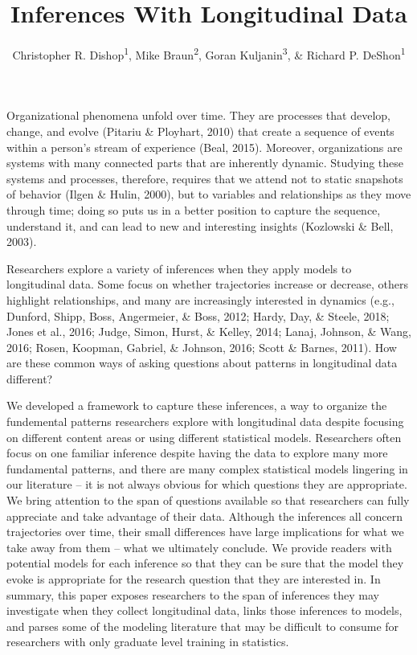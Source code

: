 \documentclass[english,,man]{apa6}
\title{Inferences With Longitudinal Data}
\author{Christopher R. Dishop\textsuperscript{1}, Mike Braun\textsuperscript{2},
Goran Kuljanin\textsuperscript{3}, \& Richard P.
DeShon\textsuperscript{1}}
\date{}
\affiliation{
\vspace{0.5cm}
\textsuperscript{1} Michigan State University\\\textsuperscript{2} University of South Florida\\\textsuperscript{3} DePaul University}
\theoremstyle{definition}
\theoremstyle{definition}
\theoremstyle{definition}
\theoremstyle{remark}
\begin{document}
\maketitle

Organizational phenomena unfold over time. They are processes that
develop, change, and evolve (Pitariu \& Ployhart, 2010) that create a
sequence of events within a person's stream of experience (Beal, 2015).
Moreover, organizations are systems with many connected parts that are
inherently dynamic. Studying these systems and processes, therefore,
requires that we attend not to static snapshots of behavior (Ilgen \&
Hulin, 2000), but to variables and relationships as they move through
time; doing so puts us in a better position to capture the sequence,
understand it, and can lead to new and interesting insights (Kozlowski
\& Bell, 2003).

Researchers explore a variety of inferences when they apply models to
longitudinal data. Some focus on whether trajectories increase or
decrease, others highlight relationships, and many are increasingly
interested in dynamics (e.g., Dunford, Shipp, Boss, Angermeier, \& Boss,
2012; Hardy, Day, \& Steele, 2018; Jones et al., 2016; Judge, Simon,
Hurst, \& Kelley, 2014; Lanaj, Johnson, \& Wang, 2016; Rosen, Koopman,
Gabriel, \& Johnson, 2016; Scott \& Barnes, 2011). How are these common
ways of asking questions about patterns in longitudinal data different?

We developed a framework to capture these inferences, a way to organize
the fundemental patterns researchers explore with longitudinal data
despite focusing on different content areas or using different
statistical models. Researchers often focus on one familiar inference
despite having the data to explore many more fundamental patterns, and
there are many complex statistical models lingering in our literature --
it is not always obvious for which questions they are appropriate. We
bring attention to the span of questions available so that researchers
can fully appreciate and take advantage of their data. Although the
inferences all concern trajectories over time, their small differences
have large implications for what we take away from them -- what we
ultimately conclude. We provide readers with potential models for each
inference so that they can be sure that the model they evoke is
appropriate for the research question that they are interested in. In
summary, this paper exposes researchers to the span of inferences they
may investigate when they collect longitudinal data, links those
inferences to models, and parses some of the modeling literature that
may be difficult to consume for researchers with only graduate level
training in statistics.
\end{document}
